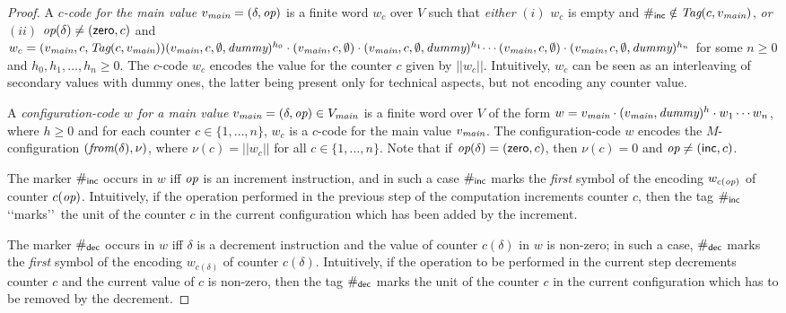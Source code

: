 \begin{proof}
A \emph{$c$-code for the main value $v_{\textit{main}}= (\delta,{\textit{op}})$} is a  finite word $w_c$ over $V$ such that
\emph{either} $(i)$ $w_c$ is empty and $\#_{\mathsf{inc}}\notin{\textit{Tag}}(c,v_{\textit{main}})$, \emph{or} $(ii)$ ${\textit{op}}(\delta)\neq ({\mathsf{zero}},c)$ and $w_c=(v_{\textit{main}},c,{\textit{Tag}}(c,v_{\textit{main}}))(v_{\textit{main}},c,\emptyset,{\textit{dummy}})^{h_0}\cdot (v_{\textit{main}},c,\emptyset)\cdot (v_{\textit{main}},c,\emptyset,{\textit{dummy}})^{h_1}\!\cdots\allowbreak (v_{\textit{main}},c,\emptyset)\cdot (v_{\textit{main}},c,\emptyset,{\textit{dummy}})^{h_n}$ for some $n\geq 0$ and $h_0,h_1,\ldots,\allowbreak h_n\geq 0$. The $c$-code $w_c$ encodes the value for the counter $c$
given by $||w_c||$.
Intuitively, $w_c$ can be seen as an interleaving of secondary values with dummy ones, the latter being present only for technical aspects, but not encoding any counter value.

A \emph{configuration-code $w$  for a main value $v_{\textit{main}}=(\delta,{\textit{op}})\in V_{\textit{main}}$} is a finite word over $V$
of the form $w= v_{\textit{main}} \cdot (v_{\textit{main}},{\textit{dummy}})^{h}\cdot w_1\cdots w_n$, where $h\geq 0$ and for each counter $c\in \{1,\ldots,n\}$, $w_c$ is a $c$-code
for the main value $v_{\textit{main}}$. The configuration-code $w$ encodes the $M$-configuration $({\textit{from}}(\delta),\nu)$, where $\nu(c)=||w_c||$
for all $c\in \{1,\ldots,n\}$. Note that if ${\textit{op}}(\delta)=({\mathsf{zero}},c)$, then $\nu(c)=0$ and ${\textit{op}}\neq ({\mathsf{inc}},c)$. 

The marker $\#_{\mathsf{inc}}$ occurs in $w$ iff ${\textit{op}}$ is an increment instruction, and in such a case
 $\#_{\mathsf{inc}}$ marks the \emph{first} symbol of the encoding $w_{c({\textit{op}})}$ of counter $c({\textit{op}})$. Intuitively, if the operation performed in the previous step
 of the computation increments counter $c$, then the tag $\#_{\mathsf{inc}}$ \lq\lq marks\rq\rq\ the unit of the counter $c$ in the current configuration which has been added by the increment.

The marker $\#_{\mathsf{dec}}$ occurs in $w$ iff $\delta$ is a decrement instruction and the value of counter $c(\delta)$ in $w$ is non-zero; in such a case,
 $\#_{\mathsf{dec}}$ marks the \emph{first} symbol of the encoding $w_{c(\delta)}$ of counter $c(\delta)$. Intuitively, if the operation to be performed in the current step
 decrements counter $c$ and the current value of %
 $c$ is non-zero, then the tag $\#_{\mathsf{dec}}$  marks  the unit of the counter $c$  in the current configuration which has to be removed by the decrement.





\end{proof}
